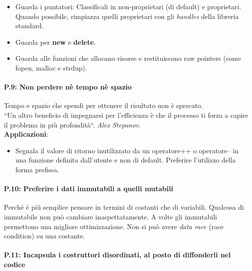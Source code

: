 \begin{itemize}
	\item \textsf{\small Guarda i puntatori: Classificali in non-proprietari (di default) e proprietari. Quando possibile, rimpiazza quelli proprietari con gli \emph{handles} della libreria standard.}
	\item \textsf{\small Guarda per \textbf{new} e \textbf{delete}.}
	\item \textsf{\small Guarda alle funzioni che allocano risorse e restituiscono raw pointers (come fopen, malloc e strdup).}
\end{itemize}

\paragraph{P.9: Non perdere nè tempo nè spazio}

\textsf{\small Tempo e spazio che spendi per ottenere il risultato non è sprecato.} \\

\textsf{``Un altro beneficio di impegnarsi per l'efficienza è che il processo ti forza a capire il problema in più profondità``.}
\textsf{\emph{Alex Stepanov}.} \\

\textsf{\small \textbf{Applicazioni}: }

\begin{itemize}
	\item \textsf{\small Segnala il valore di ritorno inutilizzato da un operatore++ o operatore-- in una funzione definita dall'utente e non di default. Preferire l'utilizzo della forma prefissa. }
\end{itemize}

\paragraph{P.10: Preferire i dati immutabili a quelli mutabili}

\textsf{\small Perché è più semplice pensare in termini di costanti che di variabili. Qualcosa di immutabile non può cambiare inaspettatamente. A volte gli immutabili permettono una migliore ottimizzazione. Non si può avere \emph{data race} (race condition) su una costante.} \\

\paragraph{P.11: Incapsula i costruttori disordinati, al posto di diffonderli nel codice}

